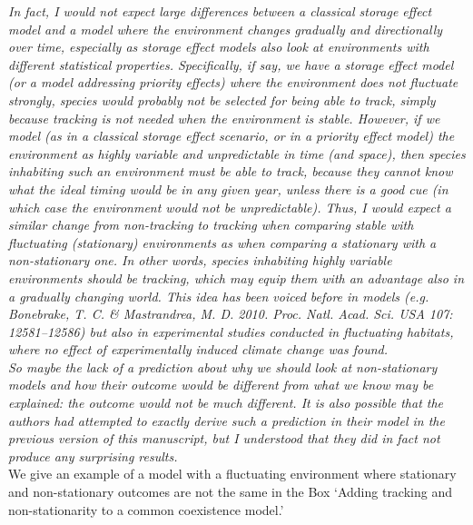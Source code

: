 \documentclass[11pt]{article}
\begin{document}
\emph{In fact, I would not expect large differences between a classical storage effect model and a
model where the environment changes gradually and directionally over time, especially as
storage effect models also look at environments with different statistical properties.
Specifically, if say, we have a storage effect model (or a model addressing priority effects)
where the environment does not fluctuate strongly, species would probably not be selected for
being able to track, simply because tracking is not needed when the environment is stable.
However, if we model (as in a classical storage effect scenario, or in a priority effect
model) the environment as highly variable and unpredictable in time (and space), then species
inhabiting such an environment must be able to track, because they cannot know what the ideal
timing would be in any given year, unless there is a good cue (in which case the environment
would not be unpredictable). Thus, I would expect a similar change from non-tracking to
tracking when comparing stable with fluctuating (stationary) environments as when comparing a
stationary with a non-stationary one. In other words, species inhabiting highly variable
environments should be tracking, which may equip them with an advantage also in a gradually
changing world. This idea has been voiced before in models (e.g. Bonebrake, T. C. \&
Mastrandrea, M. D. 2010. Proc. Natl. Acad. Sci. USA 107: 12581–12586) but also in
experimental studies conducted in fluctuating habitats, where no effect of experimentally
induced climate change was found.\\
So maybe the lack of a prediction about why we should look at non-stationary models and how
their outcome would be different from what we know may be explained: the outcome would not be
much different. It is also possible that the authors had attempted to exactly derive such a
prediction in their model in the previous version of this manuscript, but I understood that
they did in fact not produce any surprising results.}\\

We give an example of a model with a fluctuating environment where stationary and non-stationary outcomes are not the same in the Box `Adding tracking and non-stationarity to a common coexistence model.' \\
\end{document}
